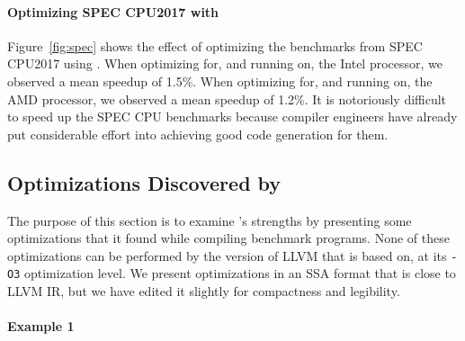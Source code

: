 \paragraph{Optimizing SPEC CPU2017 with \minotaur{}}

Figure~\ref{fig:spec} shows the effect of optimizing the benchmarks
from SPEC CPU2017 using \minotaur.
%
When optimizing for, and running on, the Intel processor, we observed
a mean speedup of 1.5\%.
%
When optimizing for, and running on, the AMD processor, we observed a
mean speedup of 1.2\%.
%
It is notoriously difficult to speed up the SPEC CPU benchmarks
because compiler engineers have already put considerable effort into
achieving good code generation for them.



\subsection{Optimizations Discovered by \minotaur}
\label{sec:examples}

The purpose of this section is to examine \minotaur's strengths by
presenting some optimizations that it found while compiling benchmark
programs.
%
None of these optimizations can be performed by the version of LLVM
that \minotaur{} is based on,
at its \texttt{-O3} optimization level.
%
We present optimizations in an SSA format that is close to LLVM IR,
but we have edited it slightly for compactness and legibility.

\paragraph*{Example 1}


